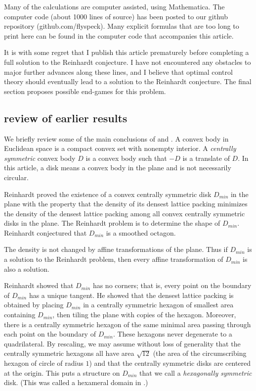 \documentclass{article}
\theoremstyle{remark}
\def\DR{D_{min}}
\begin{document}
Many of the calculations are computer assisted, using Mathematica.
The computer code (about 1000 lines of source) has been posted to our
github repository (github.com/flyspeck).  Many explicit formulas that
are too long to print here can be found in the computer code that
accompanies this article.

It is with some regret that I publish this article prematurely before
completing a full solution to the Reinhardt conjecture.  I have not
encountered any obstacles to major further advances along these lines,
and I believe that optimal control theory should eventually lead
to a solution to the Reinhardt conjecture.  The final section proposes
possible end-games for this problem.

\subsection{review of earlier results}\label{sec:review}

We briefly review some of the main conclusions of
\cite{Reinhardt:1934} and \cite{hales2011reinhardt}.  A convex body in
Euclidean space is a compact convex set with nonempty interior.  A
{\it centrally symmetric} convex body $D$ is a convex body such that
$-D$ is a translate of $D$.  In this article, a disk means a convex
body in the plane and is not necessarily circular.  

Reinhardt proved the existence of a convex centrally symmetric disk
$\DR$ in the plane with the property that the density of its densest
lattice packing minimizes the density of the densest lattice packing
among all convex centrally symmetric disks in the plane.  The
Reinhardt problem is to determine the shape of $\DR$.  Reinhardt
conjectured that $\DR$ is a smoothed octagon.

The density is not changed by affine transformations of the plane.
Thus if $\DR$ is a solution to the Reinhardt problem, then every affine
transformation of $\DR$ is also a solution.

Reinhardt showed that $\DR$ has no corners; that is, every point on
the boundary of $\DR$ has a unique tangent.  He showed that the
densest lattice packing is obtained by placing $\DR$ in a centrally
symmetric hexagon of smallest area containing $\DR$, then tiling the
plane with copies of the hexagon.  Moreover, there is a centrally
symmetric hexagon of the same minimal area passing through each point
on the boundary of $\DR$.  These hexagons never degenerate to a
quadrilateral.  By rescaling, we may assume without loss of generality
that the centrally symmetric hexagons all have area $\sqrt{12}$ (the
area of the circumscribing hexagon of circle of radius $1$) and that
the centrally symmetric disks are centered at the origin.  This puts
a structure on $\DR$ that we call a {\it hexagonally symmetric}
disk.  (This was called a hexameral domain in
\cite{hales2011reinhardt}.)
\end{document}
